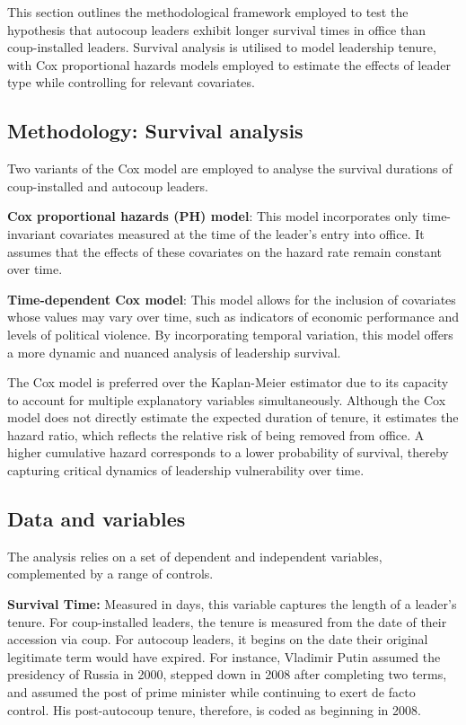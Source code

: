 \documentclass[
  12pt,
]{report}
\begin{document}
This section outlines the methodological framework employed to test the
hypothesis that autocoup leaders exhibit longer survival times in office
than coup-installed leaders. Survival analysis is utilised to model
leadership tenure, with Cox proportional hazards models employed to
estimate the effects of leader type while controlling for relevant
covariates.

\subsection*{Methodology: Survival
analysis}\label{methodology-survival-analysis}

Two variants of the Cox model are employed to analyse the survival
durations of coup-installed and autocoup leaders.

\textbf{Cox proportional hazards (PH) model}: This model incorporates
only time-invariant covariates measured at the time of the leader's
entry into office. It assumes that the effects of these covariates on
the hazard rate remain constant over time.

\textbf{Time-dependent Cox model}: This model allows for the inclusion
of covariates whose values may vary over time, such as indicators of
economic performance and levels of political violence. By incorporating
temporal variation, this model offers a more dynamic and nuanced
analysis of leadership survival.

The Cox model is preferred over the Kaplan-Meier estimator due to its
capacity to account for multiple explanatory variables simultaneously.
Although the Cox model does not directly estimate the expected duration
of tenure, it estimates the hazard ratio, which reflects the relative
risk of being removed from office. A higher cumulative hazard
corresponds to a lower probability of survival, thereby capturing
critical dynamics of leadership vulnerability over time.

\subsection*{Data and variables}\label{data-and-variables-1}

The analysis relies on a set of dependent and independent variables,
complemented by a range of controls.

\textbf{Survival Time:} Measured in days, this variable captures the
length of a leader's tenure. For coup-installed leaders, the tenure is
measured from the date of their accession via coup. For autocoup
leaders, it begins on the date their original legitimate term would have
expired. For instance, Vladimir Putin assumed the presidency of Russia
in 2000, stepped down in 2008 after completing two terms, and assumed
the post of prime minister while continuing to exert de facto control.
His post-autocoup tenure, therefore, is coded as beginning in 2008.
\end{document}
